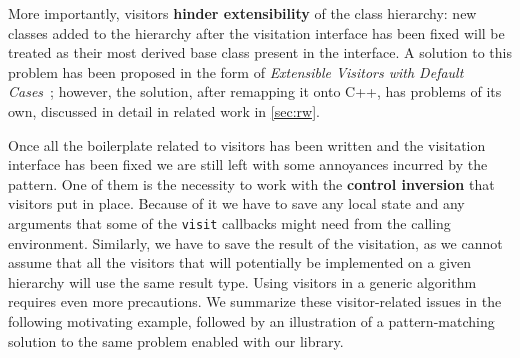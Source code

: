 \documentclass[preprint]{sigplanconf}
\makeatletter
\DeclareRobustCommand{\code}[1]{{\lstinline[breaklines=false,escapechar=@]{#1}}}
\makeatother
\begin{document}
More importantly, visitors {\bf hinder extensibility} of the class hierarchy: 
new classes added to the hierarchy after the visitation interface has been 
fixed will be treated as their most derived base class present in the interface.
A solution to this problem has been proposed in the form of \emph{Extensible 
Visitors with Default Cases}~\cite[]{Zenger:2001}; however, the 
solution, after remapping it onto C++, has problems of its own, discussed in 
detail in related work in \textsection\ref{sec:rw}.


Once all the boilerplate related to visitors has been written and the visitation 
interface has been fixed we are still left with some annoyances incurred by the 
pattern. One of them is the necessity to work with the {\bf control inversion} 
that visitors put in place. Because of it we have to save any local state and 
any arguments that some of the \code{visit} callbacks might need from the 
calling environment. Similarly, we have to save the result of the visitation, 
as we cannot assume that all the visitors that will potentially be implemented 
on a given hierarchy will use the same result type. Using visitors in a generic 
algorithm requires even more precautions. We summarize these visitor-related 
issues in the following motivating example, followed by an illustration of a 
pattern-matching solution to the same problem enabled with our library.
\end{document}
